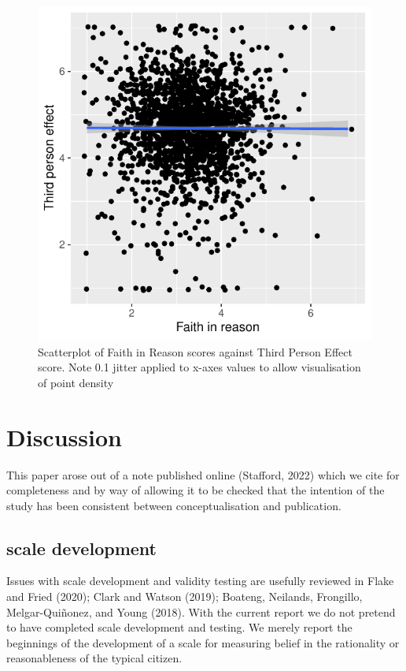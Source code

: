\documentclass[
  ,jou,floatsintext]{apa6}
\begin{document}
\begin{figure}

{\centering \includegraphics[width=0.75\linewidth]{faithinreason_files/figure-latex/tpe-1} 

}

\caption{Scatterplot of Faith in Reason scores against Third Person Effect score. Note 0.1 jitter applied to x-axes values to allow visualisation of point density}\label{fig:tpe}
\end{figure}

\hypertarget{discussion}{%
\section{Discussion}\label{discussion}}

This paper arose out of a note published online (Stafford, 2022) which we cite for completeness and by way of allowing it to be checked that the intention of the study has been consistent between conceptualisation and publication.

\hypertarget{scale-development}{%
\subsection{scale development}\label{scale-development}}

Issues with scale development and validity testing are usefully reviewed in Flake and Fried (2020); Clark and Watson (2019); Boateng, Neilands, Frongillo, Melgar-Quiñonez, and Young (2018). With the current report we do not pretend to have completed scale development and testing. We merely report the beginnings of the development of a scale for measuring belief in the rationality or reasonableness of the typical citizen.
\end{document}
